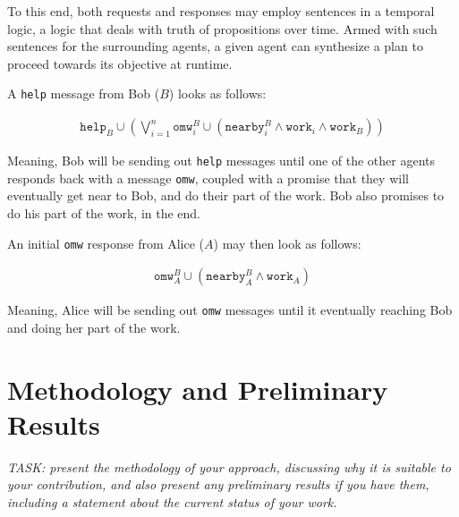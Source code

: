 \documentclass[conference]{IEEEtran}
\begin{document}
To this end, both requests and responses may employ sentences in a
temporal logic, a logic that deals with truth of propositions over
time\cite{1977-Temporal-Logic}. Armed with such sentences for the
surrounding agents, a given agent can synthesize a plan to proceed
towards its objective at runtime\cite{2022-Live-Synthesis}.

A \texttt{help} message from Bob ($B$) looks as follows:

\begin{align}
\mathtt{help}_B \cup %
  \left( \bigvee_{i=1}^n %
    \mathtt{omw}_i^B \cup %
    \left(\mathtt{nearby}_i^B \wedge \mathtt{work}_i \wedge \mathtt{work}_B \right) %
  \right) %
\end{align}

Meaning, Bob will be sending out \texttt{help} messages until one of
the other agents responds back with a message \texttt{omw}, coupled
with a promise that they will eventually get near to Bob, and do their
part of the work. Bob also promises to do his part of the work, in the
end.

An initial \texttt{omw} response from Alice ($A$) may then look as
follows:

\begin{align}
\mathtt{omw}^B_A \cup %
  \left( \mathtt{nearby}_A^B \wedge \mathtt{work}_A \right)%
\end{align}

Meaning, Alice will be sending out \texttt{omw} messages until it
eventually reaching Bob and doing her part of the work.



\section{Methodology and Preliminary Results}

\emph{TASK: present the methodology of your approach, discussing why
it is suitable to your contribution, and also present any preliminary
results if you have them, including a statement about the current
status of your work.}
\end{document}
